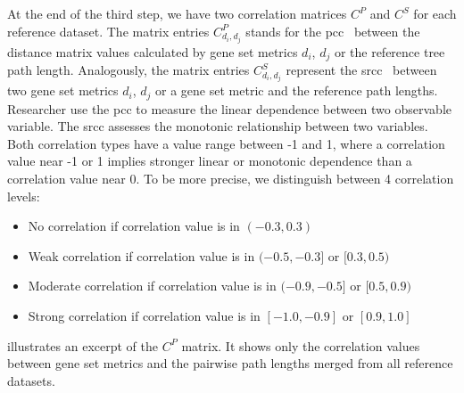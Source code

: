 \documentclass{thesisclass}
\begin{document}
At the end of the third step, we have two correlation matrices $C^{P}$ and $C^S$ for each reference dataset.
The matrix entries $C^P_{d_i,d_j}$ stands for the \acrfull{pcc}~\cite{doi:10.1002/9781119454205.ch10} between the distance matrix values calculated by gene set metrics $d_i$, $d_j$ or the reference tree path length. 
Analogously, the matrix entries $C^S_{d_i,d_j}$ represent the \acrfull{srcc}~\cite{doi:10.1002/9781119454205.ch10} between two gene set metrics $d_i$, $d_j$ or a gene set metric and the reference path lengths. 
Researcher use the \acrfull{pcc} to measure the linear dependence between two observable variable. 
The \acrshort{srcc} assesses the monotonic relationship between two variables. Both correlation types have a value range between -1 and 1, where a correlation value near -1 or 1 implies stronger linear or monotonic dependence than a correlation value near 0. 
To be more precise, we distinguish between 4 correlation levels:
\begin{itemize}
	\item No correlation if correlation value is in $(-0.3, 0.3)$
	\item Weak correlation if correlation value is in $(-0.5,-0.3]$ or $[0.3,0.5)$
	\item Moderate correlation if correlation value is in $(-0.9,-0.5]$ or $[0.5,0.9)$
	\item Strong correlation if correlation value is in $[-1.0,-0.9]$ or $[0.9,1.0]$
\end{itemize}

 illustrates an excerpt of the $C^P$ matrix. 
It shows only the correlation values between gene set metrics and the pairwise path lengths merged from all reference datasets. 
\end{document}
